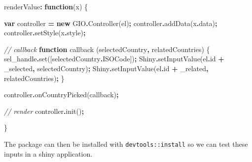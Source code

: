 \documentclass[
]{krantz}
\makeatletter
\newenvironment{Shaded}{\begin{snugshade}}{\end{snugshade}}
\newcommand{\AttributeTok}[1]{\textcolor[rgb]{0.61,0.61,0.61}{#1}}
\newcommand{\CommentTok}[1]{\textcolor[rgb]{0.37,0.37,0.37}{\textit{#1}}}
\newcommand{\FunctionTok}[1]{\textcolor[rgb]{0,0,0}{#1}}
\newcommand{\KeywordTok}[1]{\textcolor[rgb]{0.27,0.27,0.27}{\textbf{#1}}}
\newcommand{\NormalTok}[1]{#1}
\newcommand{\OperatorTok}[1]{\textcolor[rgb]{0.43,0.43,0.43}{\textbf{#1}}}
\newcommand{\StringTok}[1]{\textcolor[rgb]{0.5,0.5,0.5}{#1}}
\newenvironment{kframe}{%
\medskip{}
\setlength{\fboxsep}{.8em}
 \def\at@end@of@kframe{}%
 \ifinner\ifhmode%
  \def\at@end@of@kframe{\end{minipage}}%
  \begin{minipage}{\columnwidth}%
 \fi\fi%
 \def\FrameCommand##1{\hskip\@totalleftmargin \hskip-\fboxsep
 \colorbox{shadecolor}{##1}\hskip-\fboxsep
     \hskip-\linewidth \hskip-\@totalleftmargin \hskip\columnwidth}%
 \MakeFramed {\advance\hsize-\width
   \@totalleftmargin\z@ \linewidth\hsize
   \@setminipage}}%
 {\par\unskip\endMakeFramed%
 \at@end@of@kframe}
\renewenvironment{Shaded}{\begin{kframe}}{\end{kframe}}
\makeatother
\begin{document}
\begin{Shaded}
\begin{Highlighting}[]
\NormalTok{renderValue}\OperatorTok{:} \KeywordTok{function}\NormalTok{(x) \{}

  \KeywordTok{var}\NormalTok{ controller }\OperatorTok{=} \KeywordTok{new}\NormalTok{ GIO}\OperatorTok{.}\FunctionTok{Controller}\NormalTok{(el)}\OperatorTok{;}
\NormalTok{  controller}\OperatorTok{.}\FunctionTok{addData}\NormalTok{(x}\OperatorTok{.}\AttributeTok{data}\NormalTok{)}\OperatorTok{;}
\NormalTok{  controller}\OperatorTok{.}\FunctionTok{setStyle}\NormalTok{(x}\OperatorTok{.}\AttributeTok{style}\NormalTok{)}\OperatorTok{;}

  \CommentTok{// callback}
  \KeywordTok{function}\NormalTok{ callback (selectedCountry}\OperatorTok{,}\NormalTok{ relatedCountries) \{}
\NormalTok{    sel\_handle}\OperatorTok{.}\FunctionTok{set}\NormalTok{([selectedCountry}\OperatorTok{.}\AttributeTok{ISOCode}\NormalTok{])}\OperatorTok{;}
\NormalTok{    Shiny}\OperatorTok{.}\FunctionTok{setInputValue}\NormalTok{(el}\OperatorTok{.}\AttributeTok{id} \OperatorTok{+} \StringTok{\textquotesingle{}\_selected\textquotesingle{}}\OperatorTok{,}\NormalTok{ selectedCountry)}\OperatorTok{;}
\NormalTok{    Shiny}\OperatorTok{.}\FunctionTok{setInputValue}\NormalTok{(el}\OperatorTok{.}\AttributeTok{id} \OperatorTok{+} \StringTok{\textquotesingle{}\_related\textquotesingle{}}\OperatorTok{,}\NormalTok{ relatedCountries)}\OperatorTok{;}
\NormalTok{  \}}

\NormalTok{  controller}\OperatorTok{.}\FunctionTok{onCountryPicked}\NormalTok{(callback)}\OperatorTok{;}

  \CommentTok{// render}
\NormalTok{  controller}\OperatorTok{.}\FunctionTok{init}\NormalTok{()}\OperatorTok{;}

\NormalTok{\}}
\end{Highlighting}
\end{Shaded}

The package can then be installed with \texttt{devtools::install} so we can test these inputs in a shiny application.
\end{document}
